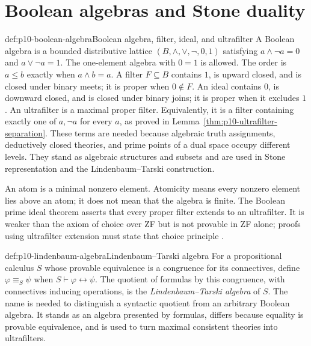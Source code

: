 


\section{Boolean algebras and Stone duality}
\label{sec:p10-stone-duality}

\begin{hbdefinition}{def:p10-boolean-algebra}{Boolean algebra, filter, ideal, and ultrafilter}
A Boolean algebra is a bounded distributive lattice
\((B,\wedge,\vee,\neg,0,1)\) satisfying
\(a\wedge\neg a=0\) and \(a\vee\neg a=1\).
The one-element algebra with \(0=1\) is allowed.
The order is \(a\leq b\) exactly when \(a\wedge b=a\).
A filter \(F\subseteq B\) contains \(1\), is upward closed, and is
closed under binary meets; it is proper when \(0\notin F\).
An ideal contains \(0\), is downward closed, and is closed under
binary joins; it is proper when it excludes \(1\).
An ultrafilter is a maximal proper filter. Equivalently, it is a
filter containing exactly one of \(a,\neg a\) for every \(a\), as
proved in Lemma~\ref{thm:p10-ultrafilter-separation}. These terms are
needed because algebraic truth assignments, deductively closed theories, and
prime points of a dual space occupy different levels. They stand as algebraic
structures and subsets and are used in Stone representation and the
Lindenbaum--Tarski construction.
\end{hbdefinition}

An atom is a minimal nonzero element. Atomicity means every nonzero element
lies above an atom; it does not mean that the algebra is finite. The Boolean
prime ideal theorem asserts that every proper filter extends to an ultrafilter.
It is weaker than the axiom of choice over ZF but is not provable in ZF alone;
proofs using ultrafilter extension must state that choice principle
\cite{Halmos1963,Koppelberg1989}.




\begin{hbdefinition}{def:p10-lindenbaum-algebra}{Lindenbaum--Tarski algebra}
For a propositional calculus \(S\) whose provable equivalence is a
congruence for its connectives, define
\(\varphi\equiv_S\psi\) when
\(S\vdash\varphi\leftrightarrow\psi\). The quotient of formulas by this
congruence, with connectives inducing operations, is the
\emph{Lindenbaum--Tarski algebra} of \(S\). The name is needed to distinguish a
syntactic quotient from an arbitrary Boolean algebra. It stands as an algebra
presented by formulas, differs because equality is provable equivalence, and
is used to turn maximal consistent theories into ultrafilters.
\end{hbdefinition}


